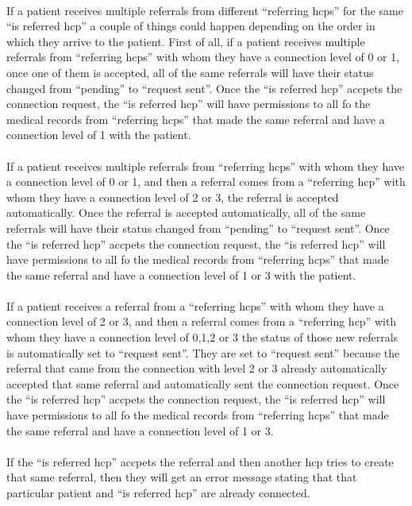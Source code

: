\paragraph{}   If a patient receives multiple referrals from different ``referring hcps'' for the same ``is referred hcp'' a couple of things could happen depending on the order in which they arrive to the patient. First of all, if a patient receives multiple referrals from ``referring hcps'' with whom they have a connection level of 0 or 1, once one of them is accepted, all of the same referrals will have their status changed from ``pending'' to ``request sent''.  Once the ``is referred hcp'' accpets the connection request, the ``is referred hcp'' will have permissions to all fo the medical records from ``referring hcps'' that made the same referral and have a connection level of 1 with the patient.

\paragraph{}   If a patient receives multiple referrals from ``referring hcps'' with whom they have a connection level of 0 or 1, and then a referral comes from a ``referring hcp'' with whom they have a connection level of 2 or 3, the referral is accepted automatically.  Once the referral is accepted automatically, all of the same referrals will have their status changed from ``pending'' to ``request sent''.  Once the ``is referred hcp'' accpets the connection request, the ``is referred hcp'' will have permissions to all fo the medical records from ``referring hcps'' that made the same referral and have a connection level of 1 or 3 with the patient.

\paragraph{}   If a patient receives a referral from a ``referring hcps'' with whom they have a connection level of 2 or 3, and then a referral comes from a ``referring hcp'' with whom they have a connection level of 0,1,2 or 3 the status of those new referrals is automatically set to ``request sent''.  They are set to ``request sent'' because the referral that came from the connection with level 2 or 3 already automatically accepted that same referral and automatically sent the connection request.  Once the ``is referred hcp'' accpets the connection request, the ``is referred hcp'' will have permissions to all fo the medical records from ``referring hcps'' that made the same referral and have a connection level of 1 or 3.

\paragraph{}   If the ``is referred hcp'' accpets the referral and then another hcp tries to create that same referral, then they will get an error message stating that that particular patient and ``is referred hcp'' are already connected.
